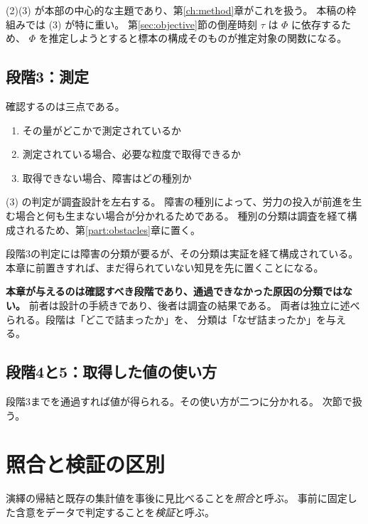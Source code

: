 (2)(3) が本部の中心的な主題であり、第\ref{ch:method}章がこれを扱う。
本稿の枠組みでは (3) が特に重い。
第\ref{sec:objective}節の倒産時刻 $\tau$ は $\Phi$ に依存するため、
$\Phi$ を推定しようとすると標本の構成そのものが推定対象の関数になる。

\subsection{段階3：測定}

確認するのは三点である。

\begin{enumerate}[label=(\arabic*)]
\item その量がどこかで測定されているか
\item 測定されている場合、必要な粒度で取得できるか
\item 取得できない場合、障害はどの種別か
\end{enumerate}

(3) の判定が調査設計を左右する。
障害の種別によって、労力の投入が前進を生む場合と何も生まない場合が分かれるためである。
種別の分類は調査を経て構成されるため、第\ref{part:obstacles}章に置く。

\begin{remark}[本章が分類そのものを与えない理由]
\label{rem:taxonomy-placement}
段階3の判定には障害の分類が要るが、その分類は実証を経て構成されている。
本章に前置きすれば、まだ得られていない知見を先に置くことになる。

\textbf{本章が与えるのは確認すべき段階であり、通過できなかった原因の分類ではない。}
前者は設計の手続きであり、後者は調査の結果である。
両者は独立に述べられる。段階は「どこで詰まったか」を、
分類は「なぜ詰まったか」を与える。
\end{remark}

\subsection{段階4と5：取得した値の使い方}

段階3までを通過すれば値が得られる。その使い方が二つに分かれる。
次節で扱う。

\section{照合と検証の区別}
\label{sec:comparison-vs-test}

演繹の帰結と既存の集計値を事後に見比べることを\emph{照合}と呼ぶ。
事前に固定した含意をデータで判定することを\emph{検証}と呼ぶ。

